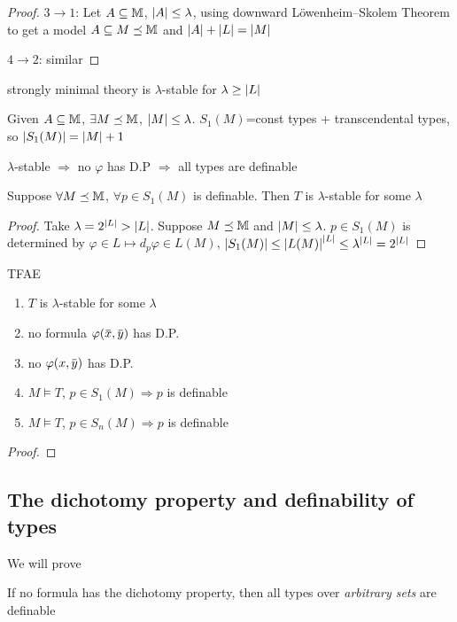 \documentclass[11pt]{article}
\begin{document}
\begin{proof}
\(3\to 1\): Let \(A\subseteq\mathbb{M}\), \(\abs{A}\le\lambda\), using downward Löwenheim–Skolem Theorem to get a model
\(A\subseteq M\preceq\mathbb{M}\) and \(\abs{A}+\abs{L}=\abs{M}\)

\(4\to 2\): similar
\end{proof}


\begin{examplle}[]
strongly minimal theory is \(\lambda\)-stable for \(\lambda\ge\abs{L}\)

Given \(A\subseteq\mathbb{M}\), \(\exists M\preceq\mathbb{M}\), \(\abs{M}\le\lambda\). \(S_1(M)\)=const types + transcendental types, so \(\abs{S_1(M)}=\abs{M}+1\)
\end{examplle}

\(\lambda\)-stable \(\Rightarrow\) no \(\varphi\) has D.P \(\Rightarrow\) all types are definable

\begin{lemma}[]
Suppose \(\forall M\preceq\mathbb{M}\), \(\forall p\in S_1(M)\) is definable. Then \(T\) is \(\lambda\)-stable for some \(\lambda\)
\end{lemma}

\begin{proof}
Take \(\lambda=2^{\abs{L}}>\abs{L}\). Suppose \(M\preceq\mathbb{M}\)  and \(\abs{M}\le\lambda\). \(p\in S_1(M)\) is determined
by \(\varphi\in L\mapsto  d_p\varphi\in L(M)\), \(\abs{S_1(M)}\le\abs{L(M)}^{\abs{L}}\le\lambda^{\abs{L}}=2^{\abs{L}}\)
\end{proof}

\begin{theorem}[]
TFAE
\begin{enumerate}
\item \(T\) is \(\lambda\)-stable for some \(\lambda\)
\item no formula \(\varphi(\barx,\bary)\) has D.P.
\item no \(\varphi(x,\bary)\) has D.P.
\item \(M\vDash T\), \(p\in S_1(M)\Rightarrow p\) is definable
\item \(M\vDash T\), \(p\in S_n(M)\Rightarrow p\) is definable
\end{enumerate}
\end{theorem}

\begin{proof}

\end{proof}
\subsection{The dichotomy property and definability of types}
\label{sec:org54c2ed0}
We will prove
\begin{center}
If no formula has the dichotomy property, then all types over \emph{arbitrary sets} are definable
\end{center}
\end{document}
